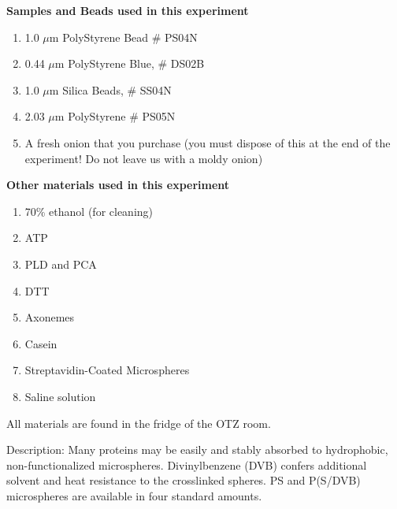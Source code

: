 \documentclass{../lab}
\begin{document}
\textbf{Samples and Beads used in this experiment}

\begin{enumerate}
    \item 1.0 $\mu$m PolyStyrene Bead \# PS04N

    \item 0.44 $\mu$m PolyStyrene Blue, \# DS02B

    \item 1.0 $\mu$m Silica Beads, \# SS04N

    \item 2.03 $\mu$m PolyStyrene \# PS05N

    \item A fresh onion that you purchase (you must dispose of this at the end of the experiment! Do not leave us with a moldy onion)

\end{enumerate}

\textbf{Other materials used in this experiment}

\begin{enumerate}
    \item 70\% ethanol (for cleaning)


    \item ATP

    \item PLD and PCA

    \item DTT

    \item Axonemes

    \item Casein


    \item Streptavidin-Coated Microspheres

    \item Saline solution
\end{enumerate}

 All materials are found in the fridge of the OTZ room.

Description: Many proteins may be easily and stably absorbed to hydrophobic, non-functionalized microspheres. Divinylbenzene (DVB) confers additional solvent and heat resistance to the crosslinked spheres. PS and P(S/DVB) microspheres are available in four standard amounts.
\end{document}
